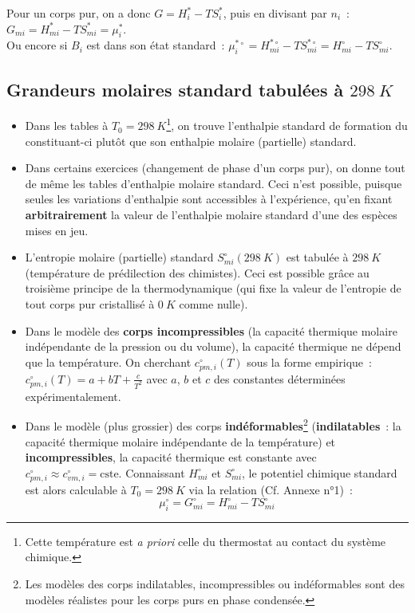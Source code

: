 \documentclass{article}
\newcommand{\cste}{\text{cste}}
\newcommand{\Tz}{T_0 = \SI{298}{K}}
\begin{document}
\begin{tableau}
    Pour un corps pur, on a donc $G=H_i^* - TS_i^*$, puis en divisant par $n_i$~: $G_{mi}=H_{mi}^* - TS_{mi}^*=\mu_i^*$.\\
    Ou encore si $B_i$ est dans son état standard~: $\mu_i^{*\circ}=H_{mi}^{*\circ} - TS_{mi}^{*\circ}=H_{mi}^{\circ} - TS_{mi}^{\circ}$.
\end{tableau}

\subsection{Grandeurs molaires standard tabulées à $\SI{298}{K}$}
\begin{itemize}
    \item Dans les tables à $\Tz$\footnote{Cette température est \textit{a priori} celle du thermostat au contact du système chimique.}, on trouve l'enthalpie standard de formation du constituant-ci plutôt que son enthalpie molaire (partielle) standard. 
	\item Dans certains exercices (changement de phase d'un corps pur), on donne tout de même les tables d'enthalpie molaire standard. Ceci n'est possible, puisque seules les variations d'enthalpie sont accessibles à l'expérience, qu'en fixant \textbf{arbitrairement} la valeur de l'enthalpie molaire standard d'une des espèces mises en jeu.
	\item L'entropie molaire (partielle) standard $S_{mi}^\circ(\SI{298}{K})$ est tabulée à $\SI{298}{K}$ (température de prédilection des chimistes). Ceci est possible grâce au troisième principe de la thermodynamique (qui fixe la valeur de l'entropie de tout corps pur cristallisé à $\SI{0}{K}$ comme nulle).
	\item Dans le modèle des \textbf{corps incompressibles} (la capacité thermique molaire indépendante de la pression ou du volume), la capacité thermique ne dépend que la température. On cherchant $c_{pm,i}^\circ(T)$ sous la forme empirique~: $c_{pm,i}^\circ(T)=a+bT+\frac{c}{T^2}$ avec $a$, $b$ et $c$ des constantes déterminées expérimentalement.
	\item Dans le modèle (plus grossier) des corps \textbf{indéformables}\footnote{Les modèles des corps indilatables, incompressibles ou indéformables sont des modèles réalistes pour les corps purs en phase condensée.} (\textbf{indilatables}~: la capacité thermique molaire indépendante de la température) et \textbf{incompressibles}, la capacité thermique est constante avec $c_{pm,i}^\circ\approx c_{vm,i}^\circ= \cste$.
	Connaissant $H_{mi}^\circ$ et $S_{mi}^\circ$, le potentiel chimique standard est alors calculable à $\Tz$ via la relation (Cf. \textsf{Annexe n°1})~:
    \begin{equation*}
        \mu_i^\circ=G_{mi}^\circ=H_{mi}^\circ-TS_{mi}^\circ
    \end{equation*}
\end{itemize}
\end{document}
